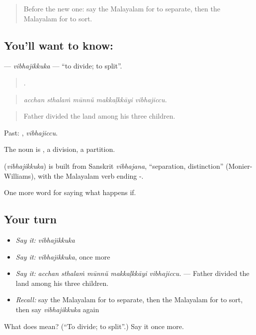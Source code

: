 \begin{quote}
Before the new one: say the Malayalam for to separate, then the Malayalam for to sort.
\end{quote}

\subsection*{You'll want to know: }
\textbf{} — \emph{vibhajikkuka} — \textquotedblleft{}to divide; to split\textquotedblright{}.

\begin{quote}
    .
\end{quote}

\begin{quote}
\emph{acchan sthalaṁ mūnnŭ makkaḷkkāyi vibhajiccu.}
\end{quote}

\begin{quote}
Father divided the land among his three children.
\end{quote}

Past: , \emph{vibhajiccu}.

The noun is , a division, a partition.

\begin{cousinweb}
\textbf{} (\emph{vibhajikkuka}) is built from Sanskrit \emph{vibhajana}, \textquotedblleft{}separation, distinction\textquotedblright{} (Monier-Williams), with the Malayalam verb ending -.
\end{cousinweb}

\begin{grammarlens}[title={What you've built}]
One more word for saying what happens if.
\end{grammarlens}

\subsection*{Your turn}
\begin{itemize}
\raggedright
  \item \emph{Say it:} \emph{vibhajikkuka}
  \item \emph{Say it:} \emph{vibhajikkuka}, once more
  \item \emph{Say it:} \emph{acchan sthalaṁ mūnnŭ makkaḷkkāyi vibhajiccu.} — Father divided the land among his three children.
  \item \emph{Recall:} say the Malayalam for to separate, then the Malayalam for to sort, then say \emph{vibhajikkuka} again
\end{itemize}

\begin{tcolorbox}[breakable,colback=teal!4,colframe=teal!35!black,title={Before you move on}]
What does  mean? (\textquotedblleft{}To divide; to split\textquotedblright{}.) Say it once more.
\end{tcolorbox}
